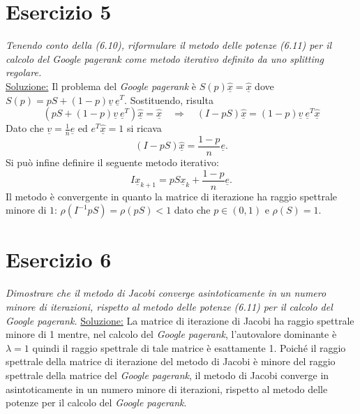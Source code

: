 \section{Esercizio 5}
\label{sub:es5}
\emph{Tenendo conto della (6.10), riformulare il metodo delle potenze (6.11) per il calcolo del \textit{Google pagerank} come metodo iterativo definito da uno splitting regolare.}\\
\underline{Soluzione:}
Il problema del \textsl{Google pagerank} è $S(p)\hat{\underline{x}}=\hat{\underline{x}}$ dove $S(p)=pS+(1-p)\underline{v}\:\underline{e}^{T}$. Sostituendo, risulta $$(pS+(1-p)\underline{v}\:\underline{e}^{T})\hat{\underline{x}}=\hat{\underline{x}}\quad\Rightarrow\quad (I-pS)\hat{\underline{x}}=(1-p)\underline{v}\:\underline{e}^T\hat{\underline{x}}$$
			Dato che $\underline{v}=\frac{1}{n}\underline{e}$ ed $e^T\hat{\underline{x}}=1$ si ricava
			$$(I-pS)\hat{\underline{x}}=\frac{1-p}{n}\underline{e}.$$
			Si può infine definire il seguente metodo iterativo:
			$$I\underline{x}_{k+1}=pS\underline{x}_k+\dfrac{1-p}{n}\underline{e}.$$
			Il metodo è convergente in quanto la matrice di iterazione ha raggio spettrale minore di $1$: $\rho(I^{-1}pS)=\rho(pS)<1$ dato che $p \in (0,1)$ e $\rho(S)=1$.
\section{Esercizio 6}
\label{sub:es6}
\emph{Dimostrare che il metodo di Jacobi converge asintoticamente in un numero minore di iterazioni, rispetto al metodo delle potenze (6.11) per il calcolo del \textit{Google pagerank}.}
\underline{Soluzione:}
La matrice di iterazione di Jacobi ha raggio spettrale minore di 1 mentre, nel calcolo del \textsl{Google pagerank},
l'autovalore dominante è $\lambda=1$ quindi il raggio spettrale di tale matrice è esattamente 1.
Poiché il raggio spettrale della matrice di iterazione del metodo di Jacobi è minore del raggio spettrale della matrice del \textsl{Google pagerank},
il metodo di Jacobi converge in asintoticamente in un numero minore di iterazioni,
rispetto al metodo delle potenze per il calcolo del \textsl{Google pagerank}.
